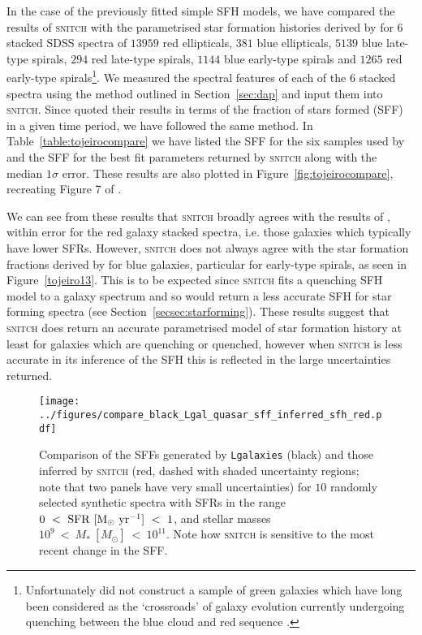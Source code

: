 \documentclass[useAMS,usenatbib]{mn2e}
\begin{document}
In the case of the previously fitted simple SFH models, we have compared the results of \textsc{snitch} with the parametrised star formation histories derived by \cite{tojeiro13} for $6$ stacked SDSS spectra of $13959$ red ellipticals, $381$ blue ellipticals, $5139$ blue late-type spirals, $294$ red late-type spirals, $1144$ blue early-type spirals and $1265$ red early-type spirals\footnote{Unfortunately \citeauthor{tojeiro13} did not construct a sample of green galaxies which have long been considered as the `crossroads' of galaxy evolution currently undergoing quenching between the blue cloud and red sequence \citep{smethurst15}.}. We measured the spectral features of each of the $6$ stacked spectra using the method outlined in Section~\ref{sec:dap} and input them into \textsc{snitch}. Since \cite{tojeiro13} quoted their results in terms of the fraction of stars formed (SFF) in a given time period, we have followed the same method. In Table~\ref{table:tojeirocompare} we have listed the SFF for the six samples used by \citeauthor{tojeiro13} and the SFF for the best fit parameters returned by \textsc{snitch} along with the median $1\sigma$ error. These results are also plotted in Figure~\ref{fig:tojeirocompare}, recreating Figure 7 of \citeauthor{tojeiro13}. 

We can see from these results that \textsc{snitch} broadly agrees with the results of \cite{tojeiro13}, within error for the red galaxy stacked spectra, i.e. those galaxies which typically have lower SFRs. However, \textsc{snitch} does not always agree with the star formation fractions derived by \cite{tojeiro13} for blue galaxies, particular for early-type spirals, as seen in Figure~\ref{tojeiro13}. This is to be expected since \textsc{snitch} fits a quenching SFH model to a galaxy spectrum and so would return a less accurate SFH for star forming spectra (see Section~\ref{secsec:starforming}). These results suggest that \textsc{snitch} does return an accurate parametrised model of star formation history at least for galaxies which are quenching or quenched, however when \textsc{snitch} is less accurate in its inference of the SFH this is reflected in the large uncertainties returned.   

\begin{figure}
\centering
\texttt{[image: ../figures/compare\_black\_Lgal\_quasar\_sff\_inferred\_sfh\_red.pdf]}
\caption{Comparison of the SFFs generated by \texttt{Lgalaxies} (black) and those inferred by \textsc{snitch} (red, dashed with shaded uncertainty regions; note that two panels have very small uncertainties) for $10$ randomly selected synthetic spectra with SFRs in the range $0~<~\rm{SFR}~[M_{\odot}~\rm{yr}^{-1}]~<~1$, and stellar masses $10^9~<~M_{*}~[M_{\odot}]~<~10^{11}$. Note how \textsc{snitch} is sensitive to the most recent change in the SFF.}
\label{fig:lgalsfhs}
\end{figure}
\end{document}
